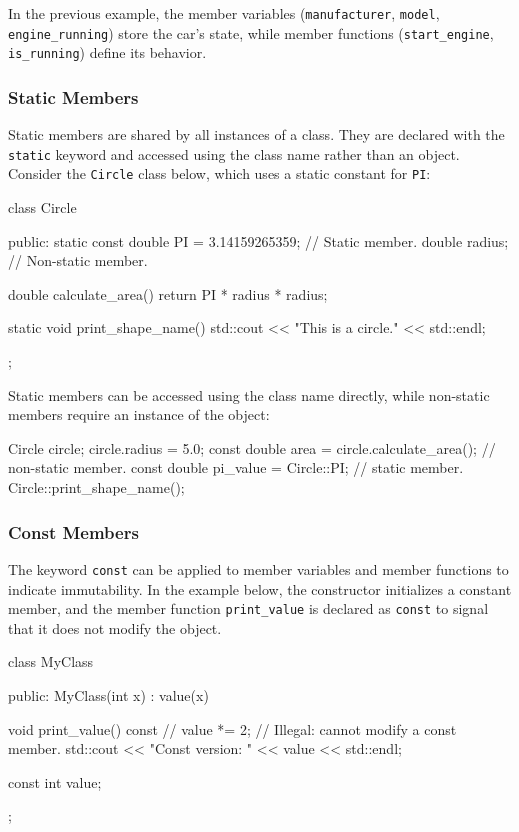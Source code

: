 \vspace{1em}

In the previous example, the member variables (\texttt{manufacturer}, \texttt{model}, \texttt{engine\_running}) store the car's state, while member functions (\texttt{start\_engine}, \texttt{is\_running}) define its behavior.

\subsubsection{Static Members}

Static members are shared by all instances of a class. They are declared with the \texttt{static} keyword and accessed using the class name rather than an object. Consider the \texttt{Circle} class below, which uses a static constant for \texttt{PI}:

\begin{codeblock}[language=C++]
class Circle {
public:
    static const double PI = 3.14159265359;   // Static member.
    double radius;                            // Non-static member.

    double calculate_area() {
        return PI * radius * radius;
    }
    
    static void print_shape_name() {
        std::cout << "This is a circle." << std::endl;
    }
};
\end{codeblock}
Static members can be accessed using the class name directly, while non-static members require an instance of the object:

\begin{codeblock}[language=C++, firstnumber=14]
Circle circle;
circle.radius = 5.0;
const double area = circle.calculate_area();  // non-static member.
const double pi_value = Circle::PI;           // static member.
Circle::print_shape_name();
\end{codeblock}

\subsubsection{Const Members}

The keyword \texttt{const} can be applied to member variables and member functions to indicate immutability. In the example below, the constructor initializes a constant member, and the member function \texttt{print\_value} is declared as \texttt{const} to signal that it does not modify the object.

\begin{codeblock}[language=C++]
class MyClass {
public:
    MyClass(int x) : value(x) {}
        
    void print_value() const {
        // value *= 2; // Illegal: cannot modify a const member.
        std::cout << "Const version: " << value << std::endl;
    }
    
    const int value;
};
\end{codeblock}

